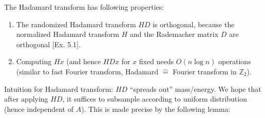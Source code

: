 \begin{remark*}
The Hadamard transform has following properties:\vspace{-0.5pc}
\begin{enumerate}[itemsep=0pt]
\item The randomized Hadamard transform $HD$ is orthogonal, because the normalized Hadamard transform $H$ and the Rademacher matrix $D$ are orthogonal [Ex. 5.1].
\item Computing $Hx$ (and hence $HDx$ for $x$ fixed needs $O(n\log n)$ operations (similar to fast Fourier transform, Hadamard $\hat{=}$ Fourier transform in $\mathbb{Z}_2$).
\end{enumerate}
\end{remark*}
Intuition for Hadamard transform: $HD$ ``spreads out'' mass/energy. We hope that after applying $HD$, it suffices to subsample according to uniform distribution (hence independent of $A$). This is made precise by the following lemma:
{} %
